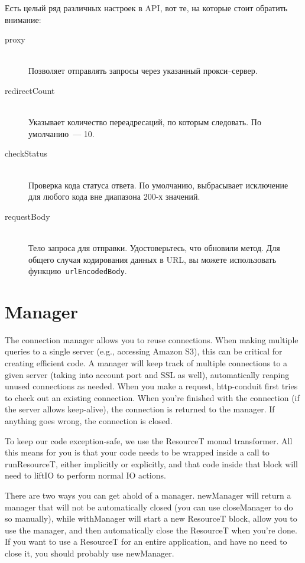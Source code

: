 Есть целый ряд различных настроек в API, вот те, на которые стоит
обратить внимание:
\begin{description}
\item[proxy] \hfill \\
  Позволяет отправлять запросы через указанный прокси--сервер.
\item[redirectCount] \hfill \\
  Указывает количество переадресаций, по которым следовать. По
  умолчанию~--- 10.
\item[checkStatus] \hfill \\
  Проверка кода статуса ответа. По умолчанию, выбрасывает исключение
  для любого кода вне диапазона 200-х значений.
\item[requestBody] \hfill \\
  Тело запроса для отправки. Удостоверьтесь, что обновили метод. Для
  общего случая кодирования данных в URL, вы можете использовать
  функцию~\lstinline!urlEncodedBody!.
\end{description}

\section{Manager}

The connection manager allows you to reuse connections. When making
multiple queries to a single server (e.g., accessing Amazon S3), this
can be critical for creating efficient code. A manager will keep track
of multiple connections to a given server (taking into account port
and SSL as well), automatically reaping unused connections as
needed. When you make a request, http-conduit first tries to check out
an existing connection. When you're finished with the connection (if
the server allows keep-alive), the connection is returned to the
manager. If anything goes wrong, the connection is closed.

To keep our code exception-safe, we use the ResourceT monad
transformer. All this means for you is that your code needs to be
wrapped inside a call to runResourceT, either implicitly or
explicitly, and that code inside that block will need to liftIO to
perform normal IO actions.

There are two ways you can get ahold of a manager. newManager will
return a manager that will not be automatically closed (you can use
closeManager to do so manually), while withManager will start a new
ResourceT block, allow you to use the manager, and then automatically
close the ResourceT when you're done. If you want to use a ResourceT
for an entire application, and have no need to close it, you should
probably use newManager.

